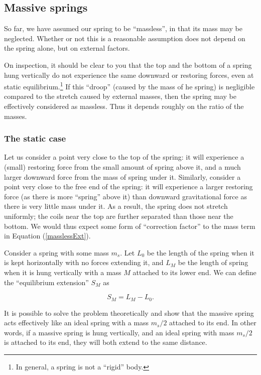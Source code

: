 \subsection*{Massive springs}

So far, we have assumed our spring to be ``massless'', in that its mass may be neglected. Whether or not this is a reasonable assumption does not depend on the spring alone, but on external factors. 

On inspection, it should be clear to you that the top and the bottom of a spring hung vertically do not experience the same downward or restoring forces, even at static equilibrium.\footnote{In general, a spring is not a ``rigid'' body.} If this ``droop'' (caused by the mass of he spring) is negligible compared to the stretch caused by external masses, then the spring may be effectively considered as massless. Thus it depends roughly on the ratio of the masses.


\subsubsection*{The static case}

Let us consider a point very close to the top of the spring: it will experience a (small) restoring force from the small amount of spring above it, and a much larger downward force from the mass of spring under it. Similarly, consider a point very close to the free end of the spring: it will experience a larger restoring force (as there is more ``spring'' above it) than downward gravitational force as there is very little mass under it. As a result, the spring does not stretch uniformly; the coils near the top are further separated than those near the bottom. We would thus expect some form of ``correction factor'' to the mass term in Equation (\ref{masslessExt}).

Consider a spring with some mass $m_s$. Let $L_0$ be the length of the spring when it is kept horizontally with no forces extending it, and $L_M$ be the length of spring when it is hung vertically with a mass $M$ attached to its lower end. We can define the ``equilibrium extension'' $S_M$ as

\begin{equation}
S_M = L_M - L_0.
\end{equation}

It is possible to solve the problem theoretically and show that the massive spring acts effectively like an ideal spring with a mass $m_s/2$ attached to its end. In other words, if a massive spring is hung vertically, and an ideal spring with mass $m_s/2$ is attached to its end, they will both extend to the same distance.

